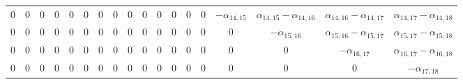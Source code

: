 \begin{tabular}{cccccccccccccccccc}
$0$ & $0$ & $0$ & $0$ & $0$ & $0$ & $0$ & $0$ & $0$ & $0$ & $0$ & $0$ & $0$ & $0$ & $-\alpha_{14,15}$ & $\alpha_{14,15}-\alpha_{14,16}$ & $\alpha_{14,16}-\alpha_{14,17}$ & $\alpha_{14,17}-\alpha_{14,18}$\\
$0$ & $0$ & $0$ & $0$ & $0$ & $0$ & $0$ & $0$ & $0$ & $0$ & $0$ & $0$ & $0$ & $0$ & $0$ & $-\alpha_{15,16}$ & $\alpha_{15,16}-\alpha_{15,17}$ & $\alpha_{15,17}-\alpha_{15,18}$\\
$0$ & $0$ & $0$ & $0$ & $0$ & $0$ & $0$ & $0$ & $0$ & $0$ & $0$ & $0$ & $0$ & $0$ & $0$ & $0$ & $-\alpha_{16,17}$ & $\alpha_{16,17}-\alpha_{16,18}$\\
$0$ & $0$ & $0$ & $0$ & $0$ & $0$ & $0$ & $0$ & $0$ & $0$ & $0$ & $0$ & $0$ & $0$ & $0$ & $0$ & $0$ & $-\alpha_{17,18}$
\end{tabular}